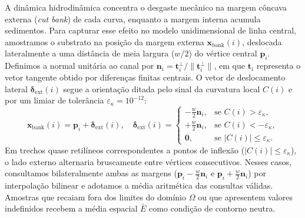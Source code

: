 \documentclass[9pt,a4paper,twocolumn]{extarticle}
\begin{document}
A dinâmica hidrodinâmica concentra o desgaste mecânico na margem côncava externa (\textit{cut bank}) de cada curva, enquanto a margem interna acumula sedimentos. Para capturar esse efeito no modelo unidimensional de linha central, amostramos o substrato na posição da margem externa $\mathbf{x}_{\text{bank}}(i)$, deslocada lateralmente a uma distância de meia largura ($w/2$) do vértice central $\mathbf{p}_i$. Definimos a normal unitária ao canal por $\mathbf{n}_i = \mathbf{t}_i^\perp / \|\mathbf{t}_i^\perp\|$, em que $\mathbf{t}_i$ representa o vetor tangente obtido por diferenças finitas centrais. O vetor de deslocamento lateral $\boldsymbol{\delta}_{\text{ext}}(i)$ segue a orientação ditada pelo sinal da curvatura local $C(i)$ e por um limiar de tolerância $\varepsilon_\kappa = 10^{-12}$:
\begin{equation}
    \mathbf{x}_{\text{bank}}(i) = \mathbf{p}_i + \boldsymbol{\delta}_{\text{ext}}(i), \quad
    \boldsymbol{\delta}_{\text{ext}}(i) =
    \begin{cases}
        -\frac{w}{2} \mathbf{n}_i, & \text{se } C(i) > \varepsilon_\kappa, \\
        +\frac{w}{2} \mathbf{n}_i, & \text{se } C(i) < -\varepsilon_\kappa, \\
        \mathbf{0}, & \text{se } |C(i)| \le \varepsilon_\kappa.
    \end{cases}
    \label{eq:cut_bank_offset}
\end{equation}
Em trechos quase retilíneos correspondentes a pontos de inflexão ($|C(i)| \le \varepsilon_\kappa$), o lado externo alternaria bruscamente entre vértices consecutivos. Nesses casos, consultamos bilateralmente ambas as margens ($\mathbf{p}_i - \frac{w}{2}\mathbf{n}_i$ e $\mathbf{p}_i + \frac{w}{2}\mathbf{n}_i$) por interpolação bilinear e adotamos a média aritmética das consultas válidas. Amostras que recaiam fora dos limites do domínio $\Omega$ ou que apresentem valores indefinidos recebem a média espacial $\bar{E}$ como condição de contorno neutra.
\end{document}
